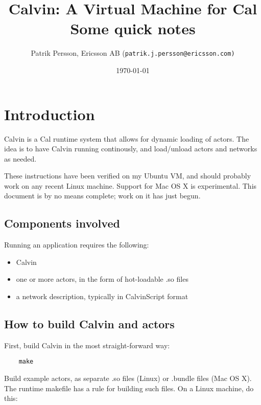 \documentclass[10pt, a4paper]{article}
\title{Calvin: A Virtual Machine for Cal\\{\Large Some quick notes}}
\author{Patrik Persson, Ericsson AB (\texttt{patrik.j.persson@ericsson.com)}}
\date{\today}
\begin{document}
\maketitle

\vfill

\tableofcontents

\vfill

\newpage

\section{Introduction}

\label{QuickIntro}

Calvin is a Cal runtime system that allows for dynamic loading of
actors. The idea is to have Calvin running continously, and
load/unload actors and networks as needed.

\vspace{5mm}\noindent%
These instructions have been verified on my
Ubuntu VM, and should probably work on any recent Linux
machine. Support for Mac OS X is experimental. This document is by no
means complete; work on it has just begun.

\subsection{Components involved}

Running an application requires the following:

\begin{itemize}
\item Calvin
\item one or more actors, in the form of hot-loadable .so files
\item a network description, typically in CalvinScript format
\end{itemize}

\subsection{How to build Calvin and actors}

First, build Calvin in the most straight-forward way:

\begin{verbatim}
    make
\end{verbatim}

Build example actors, as separate .so files (Linux) or .bundle
   files (Mac OS X). The runtime makefile has a rule for building such
   files. On a Linux machine, do this:
\end{document}
